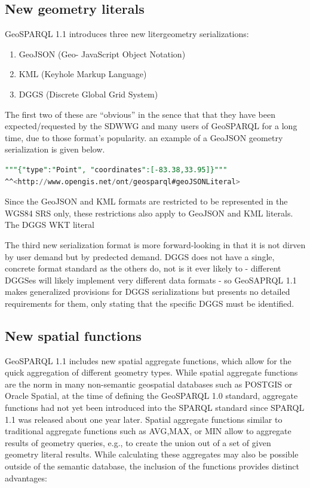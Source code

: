 \documentclass[runningheads]{llncs}
\begin{document}
\subsection{New geometry literals}\label{sec:newliterals}
GeoSPARQL 1.1 introduces three new litergeometry serializations: 

\begin{enumerate}
    \item GeoJSON (Geo- JavaScript Object Notation)\cite{butler2016geojson}
    \item KML (Keyhole Markup Language)\cite{nolan2014keyhole} 
    \item DGGS (Discrete Global Grid System)\cite{sahr1998discrete}
\end{enumerate} 

The first two of these are ``obvious'' in the sence that that they have been expected/requested by the SDWWG and many users
of GeoSPARQL for a long time, due to those format's popularity. an example of a GeoJSON geometry serialization is given below.

\small
\begin{lstlisting}[caption=GeoJSON geometry serialization example,label=lst:geojsonliteral,language=sql,frame=single,basicstyle=\ttfamily]
"""{"type":"Point", "coordinates":[-83.38,33.95]}"""
^^<http://www.opengis.net/ont/geosparql#geoJSONLiteral>
\end{lstlisting}
\normalsize
Since the GeoJSON and KML formats are restricted to be represented in the WGS84 SRS only, these restrictions 
also apply to GeoJSON and KML literals. The DGGS WKT literal  


The third new serialization format is more forward-looking in that it is not dirven by user demand but by predected demand.
DGGS does not have a single, concrete format standard as the others do, not is it ever likely to - different DGGSes will 
likely implement very different data formats - so GeoSAPRQL 1.1 makes generalized provisions for DGGS serializations but 
presents no detailed requirements for them, only stating that the specific DGGS must be identified.

\subsection{New spatial functions}\label{sec:newfunctions}
GeoSPARQL 1.1 includes new spatial aggregate functions, which allow for the quick aggregation of different geometry types. 
While spatial aggregate functions are the norm in many non-semantic geospatial databases such as POSTGIS or Oracle Spatial, 
at the time of defining the GeoSPARQL 1.0 standard, aggregate functions had not yet been introduced into the SPARQL standard 
since SPARQL 1.1 \cite{w3c_sparql_working_group_sparql_2013} was released about one year later. Spatial aggregate functions 
similar to traditional aggregate functions such as AVG,MAX, or MIN allow to aggregate results of geometry queries, e.g., to 
create the union out of a set of given geometry literal results. While calculating these aggregates may also be possible 
outside of the semantic database, the inclusion of the functions provides distinct advantages:
\end{document}
